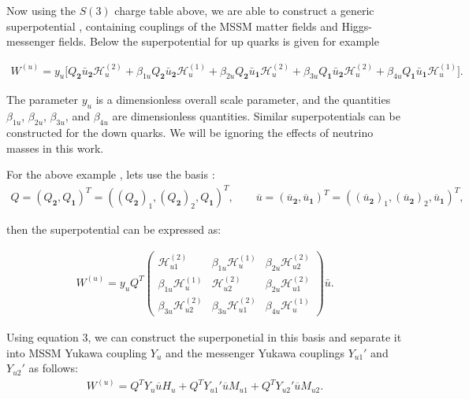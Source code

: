 Now using the $S(3)$ charge table above, we are able to construct a generic superpotential , containing couplings of the MSSM matter fields and Higgs-messenger fields. Below the superpotential for up quarks is given for example

\begin{eqnarray}
W^{(u)}= y_u\big[Q_{\mathbf 2}  \bar u_{\mathbf 2}  \mathcal{H}^{(2)}_u+\beta_{1u}Q_{\mathbf 2}  \bar u_{\mathbf 2} \mathcal{H}^{(1)}_u + \beta_{2u} Q_{\mathbf 2}  \bar u_{\mathbf 1}  \mathcal{H}^{(2)}_u +\beta_{3u} Q_{\mathbf 1}  \bar u_{\mathbf 2}  \mathcal{H}^{(2)}_u+ \beta_{4u} Q_{\mathbf 1}  \bar u_{\mathbf 1}  \mathcal{H}^{(1)}_u\big].
\label{wu}
\end{eqnarray}

The parameter $y_u$ is a dimensionless overall scale parameter, and the quantities $\beta_{1u}$, $\beta_{2u}$, $\beta_{3u}$, and $\beta_{4u}$ are dimensionless quantities. Similar superpotentials can be constructed for the down quarks. We will be ignoring the effects of neutrino masses in this work.

For the above example , lets use the basis :
\begin{eqnarray}
Q= (Q_\mathbf{2}, Q_\mathbf{1})^T = ((Q_{\mathbf 2})_1, (Q_{\mathbf 2})_2 ,Q_{\mathbf 1})^T, \qquad \overline{u}= (\overline{u}_{\mathbf{2}}, \overline{u}_\mathbf{1})^T= ((\overline{u}_{\mathbf 2})_1, (\overline{u}_\mathbf{2})_2 ,\overline{u}_{\mathbf 1})^T,
\end{eqnarray}

then the superpotential can be expressed as:

\begin{eqnarray}
W^{(u)}=y_uQ^T\left( \begin{matrix} \mathcal{H}^{(2)}_{u1}&\beta_{1u}\mathcal{H}^{(1)}_{u}&\beta_{2u} \mathcal{H}^{(2)}_{u2}\\ \beta_{1u} \mathcal{H}^{(1)}_u& \mathcal{H}^{(2)}_{u2}& \beta_{2u}\mathcal{H}^{(2)}_{u1}\\ \beta_{3u}\mathcal{H}^{(2)}_{u2}& \beta_{3u}\mathcal{H}^{(2)}_{u1}&\beta_{4u} \mathcal{H}^{(1)}_u\end{matrix}\right)\bar u. \label{UpYukawas}
\end{eqnarray}

Using equation 3, we can construct the superponetial in this basis and separate it into MSSM Yukawa coupling $Y_u$ and the messenger Yukawa couplings $Y_{u1}'$ and $Y_{u2}'$ as follows:
\begin{eqnarray}
W^{(u)} = Q^T Y_u \overline{u} H_u + Q^T Y_{u1}' \overline{u} M_{u1}+  Q^T Y_{u2}' \overline{u} M_{u2}.
\end{eqnarray}


